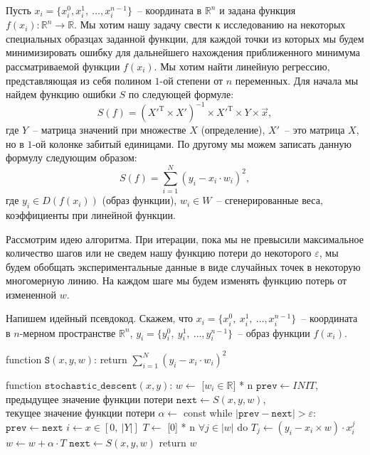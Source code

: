 \documentclass[12pt, a4paper, oneside, final]{article}
\begin{document}
	Пусть $x_{i} = \{x_i^0, x_i^1, ~ \ldots, x_i^{n - 1}\}$~-- координата в $\mathbb{R}^{n}$ и задана функция $f(x_i) : \mathbb{R}^{n} \to \mathbb{R}$.
	Мы хотим нашу задачу свести к исследованию на некоторых специальных образцах заданной функции, для каждой точки из которых мы будем минимизировать ошибку для дальнейшего нахождения приближенного минимума рассматриваемой функции $f(x_i)$.
	Мы хотим найти линейную регрессию, представляющая из себя полином $1$-ой степени от $n$ переменных.
	Для начала мы найдем функцию ошибки $S$ по следующей формуле:
	\[
		S(f) = (X'^{\mathrm{T}} \times X')^{-1} \times X'^{\mathrm{T}} \times Y \times \vec{x},
	\] где $Y$~-- матрица значений при множестве $X$ (определение), $X'$~-- это матрица $X$, но в $1$-ой колонке забитый единицами.
	По другому мы можем записать данную формулу следующим образом:
	\[
		S(f) = \sum\limits_{i = 1}^{N}{\left(y_{i} - x_{i} \cdot w_{i}\right)^{2}},
	\] где $y_{i} \in D(f(x_{i}))$ (образ функции), $w_{i} \in W$~-- сгенерированные веса, коэффициенты при линейной функции.

	Рассмотрим идею алгоритма.
	При итерации, пока мы не превысили максимальное количество шагов или не сведем нашу функцию потери до некоторого $\varepsilon$, мы будем обобщать экспериментальные данные в виде случайных точек в некоторую многомерную линию.
	На каждом шаге мы будем изменять функцию потерь от измененной $w$.

	Напишем идейный псевдокод.
	Скажем, что $x_{i} = \{x^{0}_{i}, ~ x^{1}_{i}, ~ \ldots, x^{n - 1}_{i}\}$~-- координата в $n$-мерном пространстве $\mathbb{R}^{n}$, $y_{i} = \{y^{0}_{i}, ~ y^{1}_{i}, ~ \ldots, y^{n - 1}_{i}\}$~-- образ функции $f(x_{i})$.
	\begin{mylisting}
function $\mathtt{S}(x, y, w)$:
	return $\sum\limits_{i = 1}^{N}{(y_{i} - x_{i} \cdot w_{i})^{2}}$

function $\mathtt{stochastic\_descent}(x, y)$:
	$w \gets$ [$w_{i} \in \mathbb{R}$] * n
	$\mathtt{prev} \gets INIT$, $\text{предыдущее значение функции потери}$
	$\mathtt{next} \gets S(x, y, w)$, $\text{текущее значение функции потери}$
	$\alpha \gets$ const
	while $|\mathtt{prev} - \mathtt{next}| > \varepsilon$:
		$\mathtt{prev} \gets \mathtt{next}$
		$i \gets x \in [0, ~ |Y|]$
		$T \gets$ [0] * n
		$\forall j \in |w|$ do
			$T_{j} \gets (y_{i} - x_{i} \times w) \cdot x_{i}^{j}$
		$w \gets w + \alpha \cdot T$
		$\mathtt{next} \gets S(x, y, w)$
	return $w$
	\end{mylisting}
\end{document}
